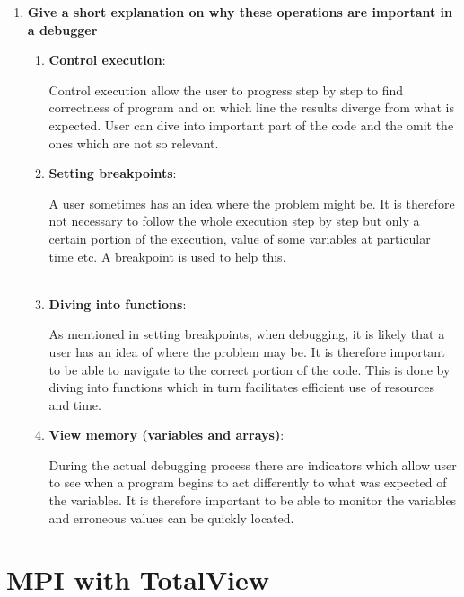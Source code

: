 \documentclass[10pt, letterpaper, twoside]{article}
\begin{document}
\begin{titlepage}
\begin{enumerate}
\begin{enumerate}
\end{enumerate}


\item \textbf{Give a short explanation on why these operations are important in a debugger}

\begin{enumerate}
\item \textbf{Control execution}:

Control execution allow the user to progress step by step to
find correctness of program and on which line the results diverge from what is expected. User can dive into important part of the code and the omit the ones which are not so relevant. \\

\item \textbf{Setting breakpoints}:

A user sometimes has an idea where the problem might be. It is therefore not necessary to follow the whole execution step by step but only a certain portion of the execution, value of some variables at particular time etc. A breakpoint is used to help this. \\ \\

\item \textbf{Diving into functions}:

As mentioned in setting breakpoints, when debugging, it is likely that a user has an idea of where the problem may be. It is therefore important to be able to navigate to the correct portion of the code. This is done by diving into functions which in turn facilitates efficient use of resources and time.\\

\item \textbf{View memory (variables and arrays)}:

During the actual debugging process there are indicators which allow user to see when a program begins to act differently to what was expected of the variables. It is therefore important to be able to monitor the variables and erroneous values can be quickly located. \\
\end{enumerate}
\end{enumerate}

\section{MPI with TotalView}


\end{titlepage}
\end{document}
